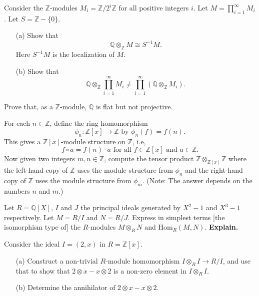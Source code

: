 \begin{prob}[S2009-Q5]
    Consider the \(\mathbb{Z}\)-modules \(M_i = \mathbb{Z}/2^i\mathbb{Z}\) for all positive integers \(i\). Let \(M = \prod_{i=1}^{\infty} M_i\). Let \(S = \mathbb{Z} - \{0\}\).
    \begin{itemize}
        \item[(a)] Show that
        \[\mathbb{Q} \otimes_{\mathbb{Z}} M \cong S^{-1}M.\]
        Here \(S^{-1}M\) is the localization of \(M\).
        \item[(b)] Show that
        \[\mathbb{Q} \otimes_{\mathbb{Z}} \prod_{i=1}^{\infty} M_i \neq \prod_{i=1}^{\infty} (\mathbb{Q} \otimes_{\mathbb{Z}} M_i).\]
    \end{itemize}
\end{prob}

\begin{prob}[S2013-Q1]
    Prove that, as a $\mathbb{Z}$-module, $\mathbb{Q}$ is flat but not projective.
\end{prob}


\begin{prob}[F2008-Q5]
    For each \(n \in \mathbb{Z}\), define the ring homomorphism
    \[\phi_n : \mathbb{Z}[x] \to \mathbb{Z} \text{ by } \phi_n(f) = f(n).\]
    This gives a \(\mathbb{Z}[x]\)-module structure on \(\mathbb{Z}\), i.e,
    \[f \circ a = f(n) \cdot a \text{ for all } f \in \mathbb{Z}[x] \text{ and } a \in \mathbb{Z}.\]
    Now given two integers \(m,n \in \mathbb{Z}\), compute the tensor product \(\mathbb{Z} \otimes_{\mathbb{Z}[x]} \mathbb{Z}\) where the left-hand copy of \(\mathbb{Z}\) uses the module structure from \(\phi_n\) and the right-hand copy of \(\mathbb{Z}\) uses the module structure from \(\phi_m\). (Note: The answer depends on the numbers \(n\) and \(m\).)
\end{prob}


\begin{prob}[F2014-Q2]
    Let \(R = \mathbb{Q}[X]\), \(I\) and \(J\) the principal ideals generated by \(X^2 - 1\) and \(X^3 - 1\) respectively. Let \(M = R/I\) and \(N = R/J\). Express in simplest terms [the isomorphism type of] the \(R\)-modules \(M \otimes_R N\) and \(\text{Hom}_R(M, N)\). \textbf{Explain.}
\end{prob}


\begin{prob}[F2004-Q5]
    Consider the ideal \(I = (2,x)\) in \(R = \mathbb{Z}[x]\).
    \begin{itemize}
        \item[(a)] Construct a non-trivial \(R\)-module homomorphism \(I \otimes_R I \to R/I\), and use that to show that \(2 \otimes x - x \otimes 2\) is a non-zero element in \(I \otimes_R I\).
        \item[(b)] Determine the annihilator of \(2 \otimes x - x \otimes 2\).
    \end{itemize}
\end{prob}


